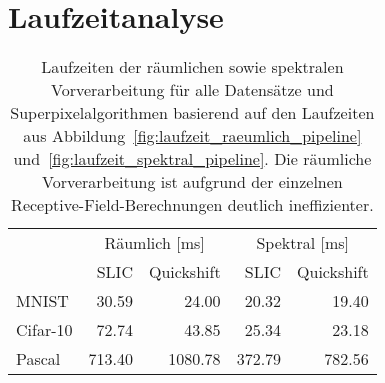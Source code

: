 \section{Laufzeitanalyse}
\label{laufzeitanalyse}





\begin{table}[t]
\centering
\begin{tabular}{lrrrr}
  \toprule
  & \multicolumn{2}{c}{Räumlich [ms]} & \multicolumn{2}{c}{Spektral [ms]}\\
  \cmidrule{2-5}
  & \gls{SLIC} & Quickshift & \gls{SLIC} & Quickshift\\
  \midrule
  \gls{MNIST} & 30.59 & 24.00 & 20.32 & 19.40\\
  \gls{Cifar}-10 & 72.74 & 43.85 & 25.34 & 23.18\\
  \gls{Pascal} & 713.40 & 1080.78 & 372.79 & 782.56\\
  \bottomrule
\end{tabular}
\caption[Laufzeiten der räumlichen und spektralen Vorverarbeitung]{Laufzeiten der räumlichen sowie spektralen Vorverarbeitung für alle Datensätze und Superpixelalgorithmen basierend auf den Laufzeiten aus Abbildung~\ref{fig:laufzeit_raeumlich_pipeline} und~\ref{fig:laufzeit_spektral_pipeline}.
Die räumliche Vorverarbeitung ist aufgrund der einzelnen Receptive-Field-Berechnungen deutlich ineffizienter.}
\label{tab:laufzeit_raeumlich_spektral}
\end{table}

